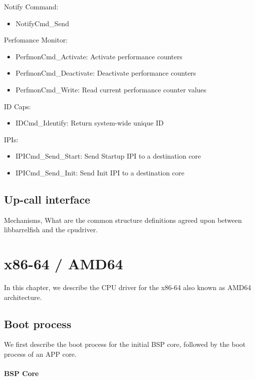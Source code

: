 \documentclass[a4paper,11pt,twoside]{report}
\begin{document}
{{Notify Command:
\begin{itemize}
\item NotifyCmd\_Send
\end{itemize}

Perfomance Monitor:
\begin{itemize}
\item PerfmonCmd\_Activate: Activate performance counters
\item PerfmonCmd\_Deactivate: Deactivate performance counters
\item PerfmonCmd\_Write: Read current performance counter values
\end{itemize}

ID Caps:
\begin{itemize}
\item IDCmd\_Identify: Return system-wide unique ID
\end{itemize}

IPIs:
\begin{itemize}
\item IPICmd\_Send\_Start: Send Startup IPI to a destination core
\item IPICmd\_Send\_Init: Send Init IPI to a destination core
\end{itemize}

\section{Up-call interface}
Mechanisms, What are the common structure definitions agreed upon between
libbarrelfish and the cpudriver.

\chapter{x86-64 / AMD64}
\label{chap:x86}

In this chapter, we describe the CPU driver for the x86-64 also known as AMD64
architecture.

\section{Boot process}

We first describe the boot process for the initial BSP core, followed by
the boot process of an APP core.

\subsubsection{BSP Core}

}}
\end{document}
